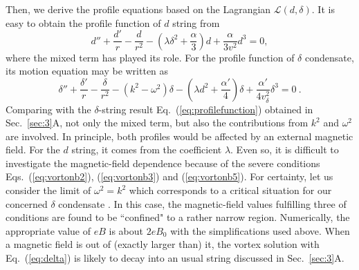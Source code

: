 \documentclass[prd, showpacs,nofootinbib,amsmath,amssymb]{revtex4}
\begin{document}
Then, we derive the profile equations based on the Lagrangian $\mathcal{L}(d,\delta)$.
It is easy to obtain the profile function of $d$ string from
\begin{equation}
  \label{eq:deuler}
  d'' +\frac{d'}{r} - \frac{d}{r^2} - (\lambda \delta^2 + \frac{\alpha}{3})d + \frac{\alpha}{3v^2}d^3 = 0,
\end{equation}
where the mixed term has played its role.
For the profile function of $\delta$ condensate, its motion equation may be written as
\begin{equation}
  \label{eq:beuler}
  \delta'' +\frac{\delta'}{r} - \frac{\delta}{r^2} - (k^2 - \omega^2)\delta - (\lambda d^2 + \frac{\alpha'}{4})\delta + \frac{\alpha'}{4v_\delta^2}\delta^3 = 0 \ .
\end{equation}
Comparing with the $\delta$-string result Eq.~(\ref{eq:profilefunction}) obtained in Sec.~\ref{sec:3}A,
not only the mixed term, but also the contributions from $k^2$ and $\omega^2$ are involved.
In principle, both profiles would be affected by an external magnetic field. For the $d$ string, it comes
from the coefficient $\lambda$. Even so, it is difficult to investigate the magnetic-field dependence
because of the severe conditions Eqs.~(\ref{eq:vortonb2}), (\ref{eq:vortonb3}) and (\ref{eq:vortonb5}).
For certainty, let us consider the limit of $\omega^2 = k^2$ which corresponds to a
critical situation for our concerned $\delta$ condensate \cite{lemperiere2003behaviour}.
In this case, the magnetic-field values fulfilling three of conditions are found to be ``confined" to a
rather narrow region.
Numerically, the appropriate value of $eB$ is about $2 eB_0$ with the simplifications used above.
When a magnetic field is out of (exactly larger than) it, the vortex solution with Eq.~(\ref{eq:delta})
is likely to decay into an usual string discussed in Sec.~\ref{sec:3}A.
\end{document}
